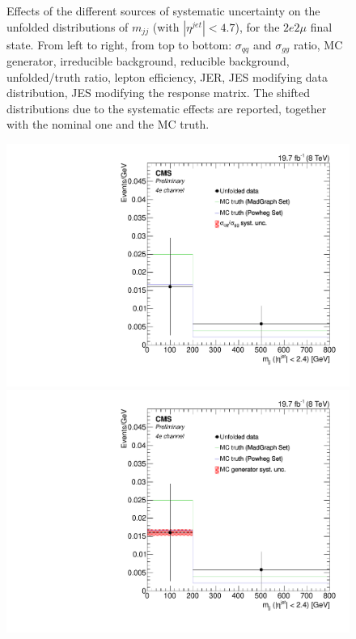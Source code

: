 \begin{figure}[hbtp]
\begin{center}
    \caption{Effects of the different sources of systematic uncertainty on the unfolded distributions of $m_{jj}$ (with $|\eta^{jet}|<4.7$), for the $2e2\mu$ final state. From left to right, from top to bottom: $\sigma_{qq}$ and $\sigma_{gg}$ ratio, MC generator, irreducible background, reducible background, unfolded/truth ratio, lepton efficiency, JER, JES modifying data distribution, JES modifying the response matrix. The shifted distributions due to the systematic effects are reported, together with the nominal one and the MC truth.}
   \label{fig:Mjj_syst_2e2m}
  \end{center}
\end{figure}
\clearpage
\begin{figure}[hbtp]
  \begin{center}
    \includegraphics[width=0.8\cmsFigWidth]{Figures/Unfolding/Systematics/ZZTo4e_CentralMjj_qqgg_Mad_fr}     
    \includegraphics[width=0.8\cmsFigWidth]{Figures/Unfolding/Systematics/ZZTo4e_CentralMjj_MCgen_Mad_fr}     

\end{center}
\end{figure}
